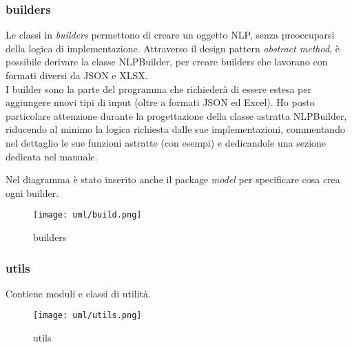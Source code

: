 \subsubsection{builders} %
Le classi in \textit{builders} permettono di creare un oggetto NLP, senza preoccuparsi della logica di implementazione. Attraverso il design pattern \textit{abstract method}, è possibile derivare la classe NLPBuilder, per creare builders che lavorano con formati diversi da JSON e XLSX.\\
I builder sono la parte del programma che richiederà di essere estesa per aggiungere nuovi tipi di input (oltre a formati JSON ed Excel). Ho posto particolare attenzione durante la progettazione della classe astratta NLPBuilder, riducendo al minimo la logica richiesta dalle sue implementazioni, commentando nel dettaglio le sue funzioni astratte (con esempi) e dedicandole una sezione dedicata nel manuale.\\

\begin{namespacedesc}
\end{namespacedesc}
Nel diagramma è stato inserito anche il package \textit{model} per specificare cosa crea ogni builder.
\begin{figure}[H]
    \centering
    \texttt{[image: uml/build.png]} 
    \caption{builders}
    \label{logo:company}
\end{figure}

\subsubsection{utils} %
Contiene moduli e classi di utilità.

\begin{namespacedesc}
\end{namespacedesc}
\begin{figure}[H]
    \centering
    \texttt{[image: uml/utils.png]} 
    \caption{utils}
    \label{logo:company}
\end{figure}

